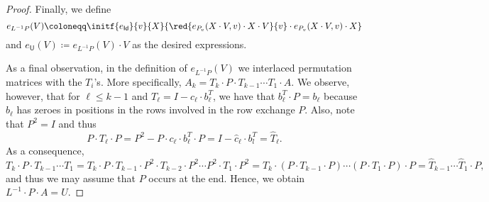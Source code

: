 \begin{proof}

Finally, we define
$$
e_{L^{-1}P}(V)\coloneqq \initf{e_{\mathsf{Id}}}{v}{X}{\red{e_{P_v}(X\cdot V,v)\cdot X\cdot V}{v}\cdot e_{P_v}(X\cdot V,v)\cdot X}
$$
and $e_{\mathsf{U}}(V)\coloneqq e_{L^{-1}P}(V)\cdot V$ as the desired expressions.

As a final observation, in the definition of $e_{L^{-1}P}(V)$ 
we interlaced permutation matrices with the $T_i$'s. More specifically, 
$A_k=T_k\cdot P\cdot T_{k-1}\cdots T_1\cdot A$. We observe, however, that for $\ell\leq k-1$ and
$T_{\ell}=I-c_\ell\cdot b_\ell^T$, we have that  $b_\ell^T\cdot P=b_\ell$ because $b_\ell$ has zeroes in positions in the rows involved in the row exchange $P$. Also, note that  $P^2=I$ and thus 
$$P\cdot T_\ell\cdot P=P^2-P\cdot c_\ell\cdot b_\ell^T\cdot P=I-\widehat{c}_\ell\cdot b_l^T=\widehat{T}_\ell.$$
%
%
As a consequence,
$$
T_k\cdot P\cdot T_{k-1}\cdots T_1=T_k\cdot P\cdot T_{k-1}\cdot P^2\cdot T_{k-2}\cdot P^2\cdots P^2 \cdot T_1\cdot P^2=T_k\cdot (P\cdot T_{k-1}\cdot P)\cdots (P\cdot T_1\cdot P)\cdot P=\widehat{T}_{k-1}\cdots \widehat{T}_1\cdot P,
$$
and thus we may assume that $P$ occurs at the end. Hence, we obtain $L^{-1}\cdot P\cdot A=U$.
%
%
\end{proof}



